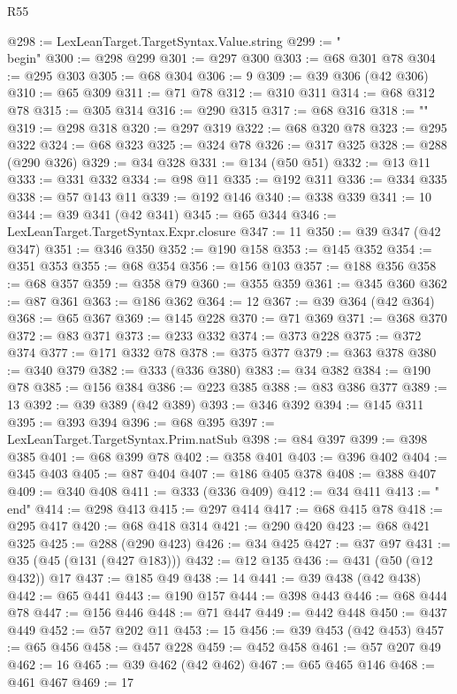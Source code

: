 \begin{lexlean}{R55}
\begin{coremodule}
@298 := LexLeanTarget.TargetSyntax.Value.string
@299 := "\\begin{"
@300 := @298 @299
@301 := @297 @300
@303 := @68 @301 @78
@304 := @295 @303
@305 := @68 @304
@306 := 9
@309 := @39 @306 (@42 @306)
@310 := @65 @309
@311 := @71 @78
@312 := @310 @311
@314 := @68 @312 @78
@315 := @305 @314
@316 := @290 @315
@317 := @68 @316
@318 := "}"
@319 := @298 @318
@320 := @297 @319
@322 := @68 @320 @78
@323 := @295 @322
@324 := @68 @323
@325 := @324 @78
@326 := @317 @325
@328 := @288 (@290 @326)
@329 := @34 @328
@331 := @134 (@50 @51)
@332 := @13 @11
@333 := @331 @332
@334 := @98 @11
@335 := @192 @311
@336 := @334 @335
@338 := @57 @143 @11
@339 := @192 @146
@340 := @338 @339
@341 := 10
@344 := @39 @341 (@42 @341)
@345 := @65 @344
@346 := LexLeanTarget.TargetSyntax.Expr.closure
@347 := 11
@350 := @39 @347 (@42 @347)
@351 := @346 @350
@352 := @190 @158
@353 := @145 @352
@354 := @351 @353
@355 := @68 @354
@356 := @156 @103
@357 := @188 @356
@358 := @68 @357
@359 := @358 @79
@360 := @355 @359
@361 := @345 @360
@362 := @87 @361
@363 := @186 @362
@364 := 12
@367 := @39 @364 (@42 @364)
@368 := @65 @367
@369 := @145 @228
@370 := @71 @369
@371 := @368 @370
@372 := @83 @371
@373 := @233 @332
@374 := @373 @228
@375 := @372 @374
@377 := @171 @332 @78
@378 := @375 @377
@379 := @363 @378
@380 := @340 @379
@382 := @333 (@336 @380)
@383 := @34 @382
@384 := @190 @78
@385 := @156 @384
@386 := @223 @385
@388 := @83 @386 @377
@389 := 13
@392 := @39 @389 (@42 @389)
@393 := @346 @392
@394 := @145 @311
@395 := @393 @394
@396 := @68 @395
@397 := LexLeanTarget.TargetSyntax.Prim.natSub
@398 := @84 @397
@399 := @398 @385
@401 := @68 @399 @78
@402 := @358 @401
@403 := @396 @402
@404 := @345 @403
@405 := @87 @404
@407 := @186 @405 @378
@408 := @388 @407
@409 := @340 @408
@411 := @333 (@336 @409)
@412 := @34 @411
@413 := "\\end{"
@414 := @298 @413
@415 := @297 @414
@417 := @68 @415 @78
@418 := @295 @417
@420 := @68 @418 @314
@421 := @290 @420
@423 := @68 @421 @325
@425 := @288 (@290 @423)
@426 := @34 @425
@427 := @37 @97
@431 := @35 (@45 (@131 (@427 @183)))
@432 := @12 @135
@436 := @431 (@50 (@12 @432)) @17
@437 := @185 @49
@438 := 14
@441 := @39 @438 (@42 @438)
@442 := @65 @441
@443 := @190 @157
@444 := @398 @443
@446 := @68 @444 @78
@447 := @156 @446
@448 := @71 @447
@449 := @442 @448
@450 := @437 @449
@452 := @57 @202 @11
@453 := 15
@456 := @39 @453 (@42 @453)
@457 := @65 @456
@458 := @457 @228
@459 := @452 @458
@461 := @57 @207 @49
@462 := 16
@465 := @39 @462 (@42 @462)
@467 := @65 @465 @146
@468 := @461 @467
@469 := 17
}
\end{coremodule}
\end{lexlean}
